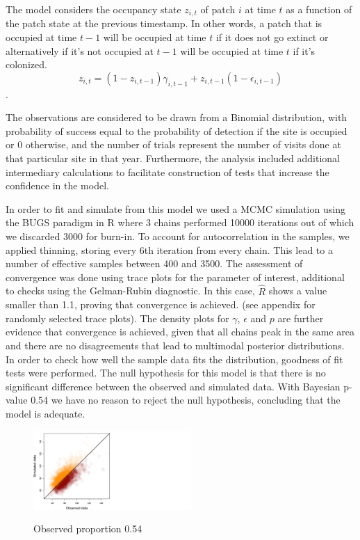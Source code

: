 \documentclass[12pt,a4paper]{article}
\begin{document}
The model considers the occupancy state $z_{i, t}$ of patch $i$ at time $t$ as a function of the patch state at the previous timestamp. In other words, a patch that is occupied at time $t-1$ will be occupied at time $t$ if it does not go extinct or alternatively if it's not occupied at $t-1$ will be occupied at time $t$ if it's colonized. $$z_{i, t} = (1 - z_{i, t-1})\gamma_{i, t-1} + z_{i, t-1}(1-\epsilon_{i, t-1})$$. 

The observations are considered to be drawn from a Binomial distribution, with probability of success equal to the probability of detection if the site is occupied or 0 otherwise, and the number of trials represent the number of visits done at that particular site in that year. Furthermore, the analysis included additional intermediary calculations to facilitate construction of tests that increase the confidence in the model.

In order to fit and simulate from this model we used a MCMC simulation using the BUGS paradigm in R where 3 chains performed 10000 iterations out of which we discarded 3000 for burn-in. To account for autocorrelation in the samples, we applied thinning, storing every 6th iteration from every chain. This lead to a number of effective samples between 400 and 3500. The assessment of convergence was done using trace plots for the parameter of interest, additional to checks using the Gelman-Rubin diagnostic. In this case, $\hat{R}$ shows a value smaller than 1.1, proving that convergence is achieved. (see appendix for randomly selected trace plots). The density plots for $\gamma$, $\epsilon$ and $p$ are further evidence that convergence is achieved, given that all chains peak in the same area and there are no disagreements that lead to multimodal posterior distributions. In order to check how well the sample data fits the distribution, goodness of fit tests were performed. The null hypothesis for this model is that there is no significant difference between the observed and simulated data. With Bayesian p-value 0.54 we have no reason to reject the null hypothesis, concluding that the model is adequate. 

\begin{figure} [H]
    \begin{center}
        \includegraphics[scale=0.6, width=6cm]{chisq.png}
        \label{fig:sampledvsdata}
        \caption{Observed proportion 0.54}
    \end{center}
\end{figure}
\end{document}

